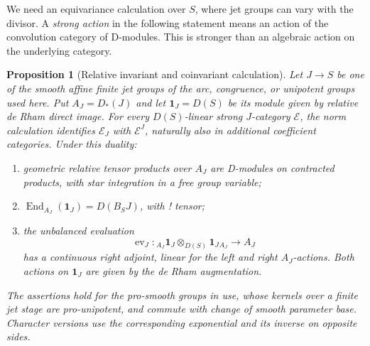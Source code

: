 \documentclass[11pt]{article}
\numberwithin{equation}{section}
\newtheorem{proposition}[theorem]{Proposition}
\theoremstyle{definition}
\theoremstyle{remark}
\begin{document}
We need an equivariance calculation over $S$, where jet groups can vary
with the divisor.  A \emph{strong action} in the following statement
means an action of the convolution category of D-modules.  This is
stronger than an algebraic action on the underlying category.

\begin{proposition}[Relative invariant and coinvariant calculation]
\label{loop:relative-equivariance}
Let $J\to S$ be one of the smooth affine finite jet groups of the arc,
congruence, or unipotent groups used here.  Put
$A_J=D_*(J)$ and let $\mathbf1_J=D(S)$ be its module given by relative
de Rham direct image.  For every $D(S)$-linear strong $J$-category
$\mathcal E$, the norm calculation identifies
$\mathcal E_J$ with $\mathcal E^J$, naturally also in additional
coefficient categories.  Under this duality:
\begin{enumerate}
\item geometric relative tensor products over $A_J$ are D-modules on
contracted products, with star integration in a free group variable;
\item $\operatorname{End}_{A_J}(\mathbf1_J)=D(B_SJ)$, with ! tensor;
\item the unbalanced evaluation
\[
 \operatorname{ev}_J:
 {}_{A_J}\mathbf1_J\otimes_{D(S)}\mathbf1_J{}_{A_J}
       \longrightarrow A_J
\]
has a continuous right adjoint, linear for the left and right
$A_J$-actions.  Both actions on $\mathbf1_J$ are given by the
de Rham augmentation.
\end{enumerate}
The assertions hold for the pro-smooth groups in use, whose kernels
over a finite jet stage are pro-unipotent, and commute with change of
smooth parameter base.  Character versions use the corresponding
exponential and its inverse on opposite sides.
\end{proposition}
\end{document}
